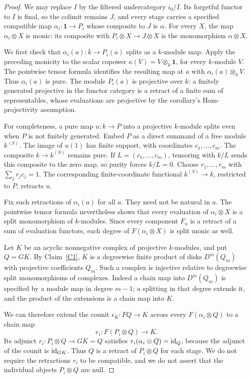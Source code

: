 \begin{proof}
We may replace $I$ by the filtered undercategory $i_0/I$. Its forgetful functor to $I$ is final, so the colimit remains $J$, and every stage carries a specified compatible map $\alpha_i:\mathbf1\to P_i$ whose composite to $J$ is $\alpha$. For every $X$, the map $\alpha_i\otimes X$ is monic: its composite with $P_i\otimes X\to J\otimes X$ is the monomorphism $\alpha\otimes X$.

We first check that $\alpha_i(a):k\to P_i(a)$ splits as a $k$-module map. Apply the preceding monicity to the scalar copower $\kappa(V)=V\otimes_k\mathbf1$, for every $k$-module $V$. The pointwise tensor formula identifies the resulting map at $a$ with $\alpha_i(a)\otimes_kV$. Thus $\alpha_i(a)$ is pure. The module $P_i(a)$ is projective over $k$: a finitely generated projective in the functor category is a retract of a finite sum of representables, whose evaluations are projective by the corollary's Hom-projectivity assumption.

For completeness, a pure map $u:k\to P$ into a projective $k$-module splits even when $P$ is not finitely generated. Embed $P$ as a direct summand of a free module $k^{(S)}$. The image of $u(1)$ has finite support, with coordinates $c_1,\ldots,c_m$. The composite $k\to k^{(S)}$ remains pure. If $L=(c_1,\ldots,c_m)$, tensoring with $k/L$ sends this composite to the zero map, so purity forces $k/L=0$. Choose $r_1,\ldots,r_m$ with $\sum_jr_jc_j=1$. The corresponding finite-coordinate functional $k^{(S)}\to k$, restricted to $P$, retracts $u$.

Fix such retractions of $\alpha_i(a)$ for all $a$. They need not be natural in $a$. The pointwise tensor formula nevertheless shows that every evaluation of $\alpha_i\otimes X$ is a split monomorphism of $k$-modules. Since every component $F_n$ is a retract of a sum of evaluation functors, each degree of $F(\alpha_i\otimes X)$ is split monic as well.

Let $K$ be an acyclic nonnegative complex of projective $k$-modules, and put $Q=GK$. By Claim~\ref{C1}, $K$ is a degreewise finite product of disks $D^m(Q_m)$ with projective coefficients $Q_m$. Such a complex is injective relative to degreewise split monomorphisms of complexes. Indeed a chain map into $D^m(Q_m)$ is specified by a module map in degree $m-1$; a splitting in that degree extends it, and the product of the extensions is a chain map into $K$.

We can therefore extend the counit $\epsilon_K:FQ\to K$ across every $F(\alpha_i\otimes Q)$ to a chain map
\[
 e_i:F(P_i\otimes Q)\longrightarrow K.
\]
Its adjunct $r_i:P_i\otimes Q\to GK=Q$ satisfies $r_i(\alpha_i\otimes Q)=\operatorname{id}_Q$, because the adjunct of the counit is $\operatorname{id}_{GK}$. Thus $Q$ is a retract of $P_i\otimes Q$ for each stage. We do not require the retractions $r_i$ to be compatible, and we do not assert that the individual objects $P_i\otimes Q$ are null.


\end{proof}
